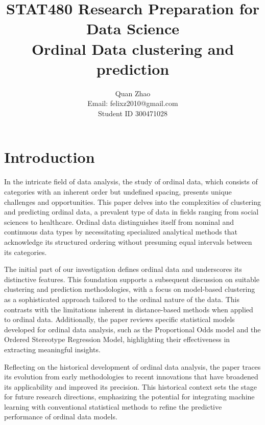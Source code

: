 \documentclass{article}
\begin{document}
\title{
  STAT480 Research Preparation for Data Science\\
  Ordinal Data clustering and prediction}

\author{Quan Zhao\\
Email: felixz2010@gmail.com\\
Student ID 300471028}

\maketitle

\section{Introduction}

In the intricate field of data analysis, the study of ordinal data, which consists of categories with an inherent order but undefined spacing, presents unique challenges and opportunities. This paper delves into the complexities of clustering and predicting ordinal data, a prevalent type of data in fields ranging from social sciences to healthcare. Ordinal data distinguishes itself from nominal and continuous data types by necessitating specialized analytical methods that acknowledge its structured ordering without presuming equal intervals between its categories.

The initial part of our investigation defines ordinal data and underscores its distinctive features. This foundation supports a subsequent discussion on suitable clustering and prediction methodologies, with a focus on model-based clustering as a sophisticated approach tailored to the ordinal nature of the data. This contrasts with the limitations inherent in distance-based methods when applied to ordinal data. Additionally, the paper reviews specific statistical models developed for ordinal data analysis, such as the Proportional Odds model and the Ordered Stereotype Regression Model, highlighting their effectiveness in extracting meaningful insights.

Reflecting on the historical development of ordinal data analysis, the paper traces its evolution from early methodologies to recent innovations that have broadened its applicability and improved its precision. This historical context sets the stage for future research directions, emphasizing the potential for integrating machine learning with conventional statistical methods to refine the predictive performance of ordinal data models.
\end{document}
